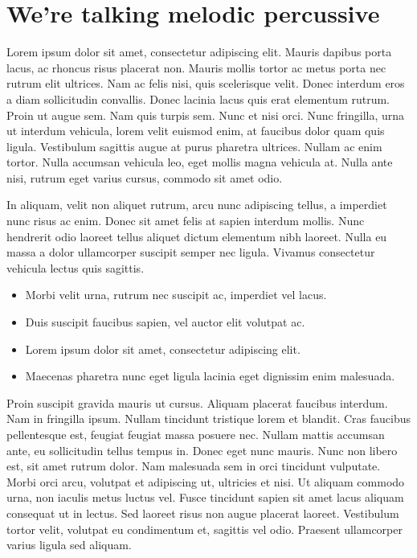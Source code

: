 \documentclass[11pt,oneside,openany]{book}
\begin{document}
\chapter{We're talking melodic percussive}\hypertarget{were-talking-melodic-percussive}{}\label{were-talking-melodic-percussive}

Lorem ipsum dolor sit amet, consectetur adipiscing elit. Mauris dapibus porta lacus, ac rhoncus risus placerat non. Mauris mollis tortor ac metus porta nec rutrum elit ultrices. Nam ac felis nisi, quis scelerisque velit. Donec interdum eros a diam sollicitudin convallis. Donec lacinia lacus quis erat elementum rutrum. Proin ut augue sem. Nam quis turpis sem. Nunc et nisi orci. Nunc fringilla, urna ut interdum vehicula, lorem velit euismod enim, at faucibus dolor quam quis ligula. Vestibulum sagittis augue at purus pharetra ultrices. Nullam ac enim tortor. Nulla accumsan vehicula leo, eget mollis magna vehicula at. Nulla ante nisi, rutrum eget varius cursus, commodo sit amet odio.

In aliquam, velit non aliquet rutrum, arcu nunc adipiscing tellus, a imperdiet nunc risus ac enim. Donec sit amet felis at sapien interdum mollis. Nunc hendrerit odio laoreet tellus aliquet dictum elementum nibh laoreet. Nulla eu massa a dolor ullamcorper suscipit semper nec ligula. Vivamus consectetur vehicula lectus quis sagittis.

\begin{itemize}
\item Morbi velit urna, rutrum nec suscipit ac, imperdiet vel lacus.
\item Duis suscipit faucibus sapien, vel auctor elit volutpat ac.
\item Lorem ipsum dolor sit amet, consectetur adipiscing elit.
\item Maecenas pharetra nunc eget ligula lacinia eget dignissim enim malesuada.
\end{itemize}

Proin suscipit gravida mauris ut cursus. Aliquam placerat faucibus interdum. Nam in fringilla ipsum. Nullam tincidunt tristique lorem et blandit. Cras faucibus pellentesque est, feugiat feugiat massa posuere nec. Nullam mattis accumsan ante, eu sollicitudin tellus tempus in. Donec eget nunc mauris. Nunc non libero est, sit amet rutrum dolor. Nam malesuada sem in orci tincidunt vulputate. Morbi orci arcu, volutpat et adipiscing ut, ultricies et nisi. Ut aliquam commodo urna, non iaculis metus luctus vel. Fusce tincidunt sapien sit amet lacus aliquam consequat ut in lectus. Sed laoreet risus non augue placerat laoreet. Vestibulum tortor velit, volutpat eu condimentum et, sagittis vel odio. Praesent ullamcorper varius ligula sed aliquam.	



\appendix
\listoffigures
\end{document}
